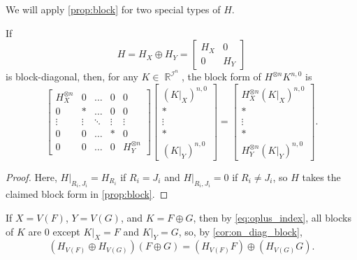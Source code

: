 \documentclass{article}
\DeclareMathOperator{\rr}{\mathbb{R}}
\DeclareMathOperator{\ic}{\mathcal{I}}
\begin{document}
We will apply \autoref{prop:block} for two special types of $H$.
\begin{corollary}
    \label{cor:on_diag_block}
    If 
    \[
        H = H_X \oplus H_Y = \begin{bmatrix} H_X & 0 \\ 0 & H_Y\end{bmatrix}
    \]
    is block-diagonal, then, for any $K \in \rr^{\ic^n}$, 
    the block form of $H^{\otimes n} K^{n,0}$ is
    \[
        \begin{bmatrix} 
            H_X^{\otimes n} & 0 & \ldots & 0 & 0\\
            0 & * & \ldots & 0 & 0\\
            \vdots & \vdots & \ddots & \vdots & \vdots \\
            0 & 0 & \ldots & * & 0\\
            0 & 0 & \ldots & 0 & H_Y^{\otimes n}
        \end{bmatrix}
        \begin{bmatrix} 
            (K|_X)^{n,0} \\ * \\ \vdots \\ * \\ (K|_Y)^{n,0}
        \end{bmatrix} =
        \begin{bmatrix} 
            H_X^{\otimes n}(K|_X)^{n,0} \\ * \\ \vdots \\ * \\ H_Y^{\otimes n}(K|_Y)^{n,0}
        \end{bmatrix}.
    \]
\end{corollary}
\begin{proof}
    Here,
    $H|_{R_i,J_i} = H_{R_i}$ if $R_i = J_i$ and $H|_{R_i,J_i} = 0$ if $R_i\neq J_i$, so $H$ takes the
    claimed block form in \autoref{prop:block}.
\end{proof}
If $X = V(F)$, $Y = V(G)$, and $K = F \oplus G$, then by \eqref{eq:oplus_index},
all blocks of $K$ are 0 except $K|_X = F$ and $K|_Y = G$, so, by \autoref{cor:on_diag_block},
\begin{equation}
    \label{eq:oplus_action}
    (H_{V(F)} \oplus H_{V(G)})(F \oplus G) = (H_{V(F)} F) \oplus (H_{V(G)} G).
\end{equation}
\end{document}
